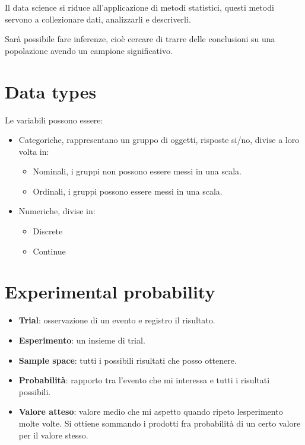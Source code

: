Il data science si riduce all'applicazione di metodi statistici, questi
metodi servono a collezionare dati, analizzarli e descriverli.

Sarà possibile fare inferenze, cioè cercare di trarre delle conclusioni
su una popolazione avendo un campione significativo.

\section{Data types}\label{data-types}

Le variabili possono essere:

\begin{itemize}
\item
  Categoriche, rappresentano un gruppo di oggetti, risposte si/no,
  divise a loro volta in:

  \begin{itemize}
  \item
    Nominali, i gruppi non possono essere messi in una scala.
  \item
    Ordinali, i gruppi possono essere messi in una scala.
  \end{itemize}
\item
  Numeriche, divise in:

  \begin{itemize}
  \item
    Discrete
  \item
    Continue
  \end{itemize}
\end{itemize}

\section{Experimental probability}\label{experimental-probability}

\begin{itemize}
\item
  \textbf{Trial}: osservazione di un evento e registro il risultato.
\item
  \textbf{Esperimento}: un insieme di trial.
\item
  \textbf{Sample space}: tutti i possibili risultati che posso ottenere.
\item
  \textbf{Probabilità}: rapporto tra l'evento che mi interessa e tutti i
  risultati possibili.
\item
  \textbf{Valore atteso}: valore medio che mi aspetto quando ripeto
  l\textquotesingle esperimento molte volte. Si ottiene sommando i
  prodotti fra probabilità di un certo valore per il valore stesso.
\end{itemize}

